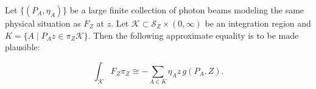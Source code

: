 Let $\{(P_A, \eta_A)\}$ be a large finite collection of photon beams modeling the same physical situation as $F_Z$ at $z$. Let $\mathcal{K} \subset \mathcal{S}_Z \times (0, \infty)$ be an integration region and $K = \{A \mid P_A z \in \pi_Z \mathcal{K}\}$. Then the following approximate equality is to be made plausible:

$$\int_{\mathcal{K}} F_Z \pi_Z \cong -\sum_{A \in K} \eta_A z \, g(P_A, Z).$$
